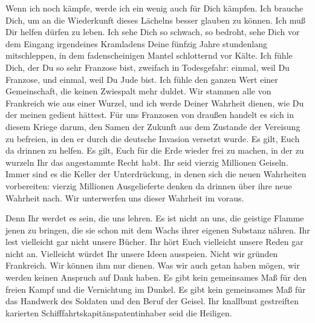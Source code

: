 \documentclass[12pt,ngerman,parskip=half,draft]{scrartcl}
\begin{document}
Wenn ich noch kämpfe, werde ich ein wenig auch für Dich kämpfen. Ich brauche Dich, um an die Wiederkunft dieses Lächelns besser glauben zu können. Ich muß Dir helfen dürfen zu leben. Ich sehe Dich so schwach, so bedroht, sehe Dich vor dem Eingang irgendeines Kramladens Deine fünfzig Jahre stundenlang mitschleppen, in dem fadenscheinigen Mantel schlotternd vor Kälte. Ich fühle Dich, der Du so sehr Franzose bist, zweifach in Todesgefahr: einmal, weil Du Franzose, und einmal, weil Du Jude bist. Ich fühle den ganzen Wert einer Gemeinschaft, die keinen Zwiespalt mehr duldet. Wir stammen alle von Frankreich wie aus einer Wurzel, und ich werde Deiner Wahrheit dienen, wie Du der meinen gedient hättest. Für uns Franzosen von draußen handelt es sich in diesem Kriege darum, den Samen der Zukunft aus dem Zustande der Vereisung zu befreien, in den er durch die deutsche Invasion versetzt wurde. Es gilt, Euch da drinnen zu helfen. Es gilt, Euch für die Erde wieder frei zu machen, in der zu wurzeln Ihr das angestammte Recht habt. Ihr seid vierzig Millionen Geiseln. Immer sind es die Keller der Unterdrückung, in denen sich die neuen Wahrheiten vorbereiten: vierzig Millionen Ausgelieferte denken da drinnen über ihre neue Wahrheit nach. Wir unterwerfen uns dieser Wahrheit im voraus.

Denn Ihr werdet es sein, die uns lehren. Es ist nicht an uns, die geistige Flamme jenen zu bringen, die sie schon mit dem Wachs ihrer eigenen Substanz nähren. Ihr lest vielleicht gar nicht unsere Bücher. Ihr hört Euch vielleicht unsere Reden gar nicht an. Vielleicht würdet Ihr unsere Ideen ausspeien. Nicht wir gründen Frankreich. Wir können ihm nur dienen. Was wir auch getan haben mögen, wir werden keinen Anspruch auf Dank haben. Es gibt kein gemeinsames Maß für den freien Kampf und die Vernichtung im Dunkel. Es gibt kein gemeinsames Maß für das Handwerk des Soldaten und den Beruf der Geisel. Ihr knallbunt gestreiften karierten Schiff\-fahrts\-kapi\-täns\-pa\-tent\-in\-ha\-ber seid die Heiligen.
\end{document}
